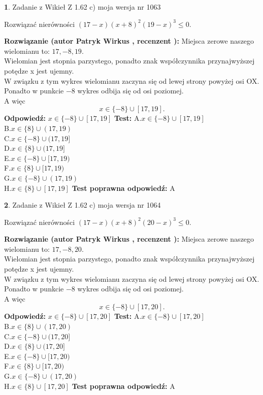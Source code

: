 \documentclass[12pt, a4paper]{article}
\theoremstyle{definition} %
\newtheorem{zad}{}
\newcommand{\zadStart}[1]{\begin{zad}#1\newline}
\newcommand{\zadStop}{\end{zad}}
\newcommand{\rozwStart}[2]{\noindent \textbf{Rozwiązanie (autor #1 , recenzent #2): }\newline}
\newcommand{\rozwStop}{\newline}
\newcommand{\odpStart}{\noindent \textbf{Odpowiedź:}\newline}
\newcommand{\odpStop}{\newline}
\newcommand{\testStart}{\noindent \textbf{Test:}\newline}
\newcommand{\testStop}{\newline}
\newcommand{\kluczStart}{\noindent \textbf{Test poprawna odpowiedź:}\newline}
\newcommand{\kluczStop}{\newline}
\begin{document}
\zadStart{Zadanie z Wikieł Z 1.62 c) moja wersja nr 1063}

Rozwiązać nierówności $(17-x)(x+8)^{2}(19-x)^{3}\le0$.
\zadStop
\rozwStart{Patryk Wirkus}{}
Miejsca zerowe naszego wielomianu to: $17, -8, 19$.\\
Wielomian jest stopnia parzystego, ponadto znak współczynnika przy\linebreak najwyższej potędze x jest ujemny.\\ W związku z tym wykres wielomianu zaczyna się od lewej strony powyżej osi OX.\\
Ponadto w punkcie $-8$ wykres odbija się od osi poziomej.\\
A więc $$x \in \{-8\} \cup [17,19].$$
\rozwStop
\odpStart
$x \in \{-8\} \cup [17,19]$
\odpStop
\testStart
A.$x \in \{-8\} \cup [17,19]$\\
B.$x \in \{8\} \cup (17,19)$\\
C.$x \in \{-8\} \cup (17,19]$\\
D.$x \in \{8\} \cup (17,19]$\\
E.$x \in \{-8\} \cup [17,19)$\\
F.$x \in \{8\} \cup [17,19)$\\
G.$x \in \{-8\} \cup (17,19)$\\
H.$x \in \{8\} \cup [17,19]$
\testStop
\kluczStart
A
\kluczStop



\zadStart{Zadanie z Wikieł Z 1.62 c) moja wersja nr 1064}

Rozwiązać nierówności $(17-x)(x+8)^{2}(20-x)^{3}\le0$.
\zadStop
\rozwStart{Patryk Wirkus}{}
Miejsca zerowe naszego wielomianu to: $17, -8, 20$.\\
Wielomian jest stopnia parzystego, ponadto znak współczynnika przy\linebreak najwyższej potędze x jest ujemny.\\ W związku z tym wykres wielomianu zaczyna się od lewej strony powyżej osi OX.\\
Ponadto w punkcie $-8$ wykres odbija się od osi poziomej.\\
A więc $$x \in \{-8\} \cup [17,20].$$
\rozwStop
\odpStart
$x \in \{-8\} \cup [17,20]$
\odpStop
\testStart
A.$x \in \{-8\} \cup [17,20]$\\
B.$x \in \{8\} \cup (17,20)$\\
C.$x \in \{-8\} \cup (17,20]$\\
D.$x \in \{8\} \cup (17,20]$\\
E.$x \in \{-8\} \cup [17,20)$\\
F.$x \in \{8\} \cup [17,20)$\\
G.$x \in \{-8\} \cup (17,20)$\\
H.$x \in \{8\} \cup [17,20]$
\testStop
\kluczStart
A
\kluczStop
\end{document}
